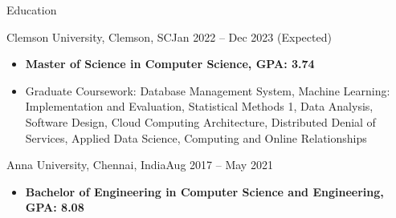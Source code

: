\documentclass[]{mcdowellcv}
\begin{document}
	\makeheader
	

\begin{cvsection}{Education}
		\begin{cvsubsection}{Clemson University, Clemson, SC}{}{Jan 2022 -- Dec 2023 (Expected)}
			\begin{itemize}
				\item \textbf {Master of Science in Computer Science, GPA: 3.74}
				\item {Graduate Coursework: Database Management System, Machine Learning: Implementation and Evaluation, Statistical Methods 1, Data Analysis, Software Design, Cloud Computing Architecture, Distributed Denial of Services, Applied Data Science, Computing and Online Relationships } 
			\end{itemize}
		\end{cvsubsection}
		\begin{cvsubsection}{Anna University, Chennai, India}{}{Aug 2017 -- May 2021}
			\begin{itemize}
				\item \textbf{Bachelor of Engineering in Computer Science and Engineering, GPA: 8.08}
			\end{itemize}
		\end{cvsubsection}
	\end{cvsection}
\end{document}
